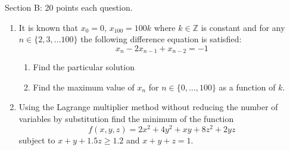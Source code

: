 \documentclass[12pt]{article} %
\theoremstyle{definition} %
\begin{document}
Section B: 20 points each question.
\begin{enumerate}
\item It is known that $x_0=0$, $x_{100}=100k$ where $k\in \mathbb{Z}$ is constant and for any $n\in\{2,3,\ldots 100\}$ the following difference equation is satisfied:
\[ x_n-2x_{n-1}+x_{n-2}=-1 \]
\begin{enumerate}
\item Find the particular solution
\item Find the maximum value of $x_n$ for $n\in\{0,\ldots,100\}$ as a function of $k$.
\end{enumerate}

\item Using the Lagrange multiplier method without reducing the number of variables by substitution find the minimum of the function \[f(x,y,z)=2x^2+4y^2+xy+8z^2+2yz\] subject to $x+y+1.5z\geq 1.2$ and $x+y+z=1$.

\end{enumerate}
\end{document}
